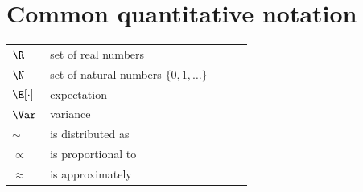 \section{Common quantitative notation}
\noindent
\begin{longtable}{p{0.15\linewidth} p{0.80\linewidth}}
    $\R$            & set of real numbers                                  \\
    $\N$            & set of natural numbers $\{0, 1, \dots\}$             \\
    $\E[\cdot]$     & expectation                                          \\
    $\Var$          & variance                                             \\
    $\sim$          & is distributed as                                    \\
    $\propto$       & is proportional to                                   \\
    $\approx$       & is approximately                                     \\
\end{longtable}
\clearpage
